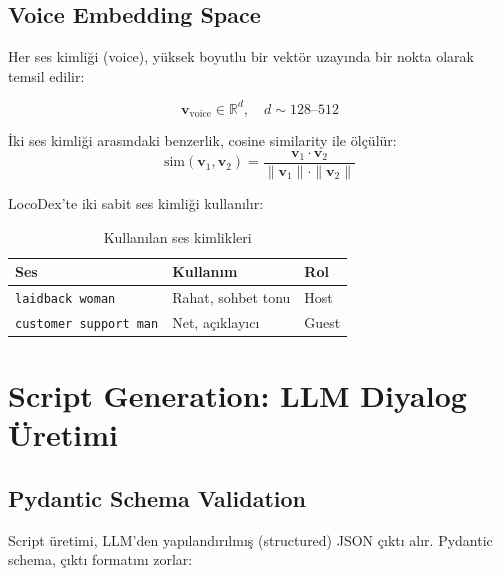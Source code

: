 \subsection{Voice Embedding Space}

Her ses kimli\u{g}i (voice), y\"{u}ksek boyutlu bir vekt\"{o}r uzay{\i}nda bir nokta olarak temsil edilir:

\begin{equation}
\label{eq:voice_embedding}
\mathbf{v}_{\text{voice}} \in \mathbb{R}^{d}, \quad d \sim 128\text{--}512
\end{equation}

\.{I}ki ses kimli\u{g}i aras{\i}ndaki benzerlik, cosine similarity ile \"{o}l\c{c}\"{u}l\"{u}r:
\begin{equation}
\label{eq:cosine_sim}
\text{sim}(\mathbf{v}_1, \mathbf{v}_2) = \frac{\mathbf{v}_1 \cdot \mathbf{v}_2}{\|\mathbf{v}_1\| \cdot \|\mathbf{v}_2\|}
\end{equation}

LocoDex'te iki sabit ses kimli\u{g}i kullan{\i}l{\i}r:

\begin{table}[H]
\centering
\caption{Kullan{\i}lan ses kimlikleri}
\label{tab:voices}
\begin{tabularx}{\textwidth}{lXl}
\toprule
\color{chapterBlue}\textbf{Ses} & \color{chapterBlue}\textbf{Kullan{\i}m} & \color{chapterBlue}\textbf{Rol} \\
\midrule
\texttt{laidback woman}       & Rahat, sohbet tonu & Host \\
\texttt{customer support man} & Net, a\c{c}{\i}klay{\i}c{\i}  & Guest \\
\bottomrule
\end{tabularx}
\end{table}


\section{Script Generation: LLM Diyalog \"{U}retimi}
\label{sec:script_generation}

\subsection{Pydantic Schema Validation}

Script \"{u}retimi, LLM'den yap{\i}land{\i}r{\i}lm{\i}\c{s} (structured) JSON \c{c}{\i}kt{\i} al{\i}r. Pydantic schema, \c{c}{\i}kt{\i} format{\i}n{\i} zorlar:

